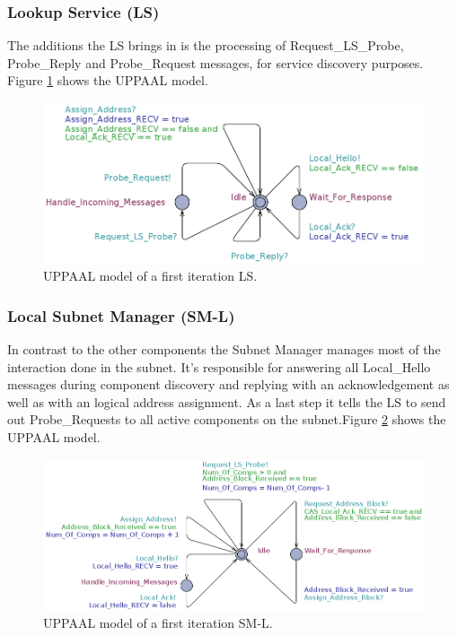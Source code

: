 \subsubsection{Lookup Service (LS)}
The additions the LS brings in is the processing of Request\_LS\_Probe,
Probe\_Reply and Probe\_Request messages, for service discovery purposes.
Figure \ref{fig:iteration1_ls} shows the UPPAAL model.

\begin{figure}[h]
    \centering
    \includegraphics[width=\textwidth]{figures/iteration1_ls}
    \caption{UPPAAL model of a first iteration LS.}
    \label{fig:iteration1_ls}
\end{figure}

\subsubsection{Local Subnet Manager (SM-L)}
In contrast to the other components the Subnet Manager manages most of the
interaction done in the subnet. It's responsible for answering all Local\_Hello
messages during component discovery and replying with an acknowledgement as
well as with an logical address assignment. As a last step it tells the LS to
send out Probe\_Requests to all active components on the subnet.Figure
\ref{fig:iteration1_sm_l} shows the UPPAAL model.

\begin{figure}[h]
    \centering
    \includegraphics[width=\textwidth]{figures/iteration1_sm_l}
    \caption{UPPAAL model of a first iteration SM-L.}
    \label{fig:iteration1_sm_l}
\end{figure}


